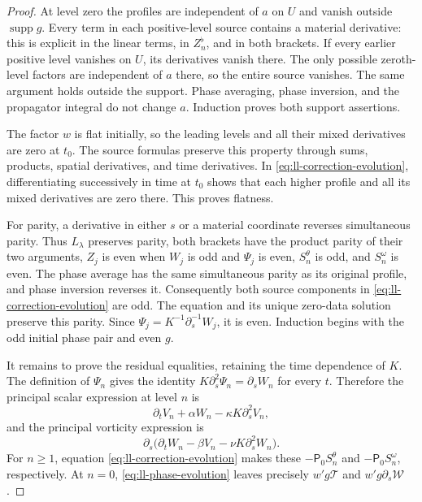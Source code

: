 \begin{proof}
At level zero the profiles are independent of $a$ on $U$ and vanish
outside $\operatorname{supp}g$. Every term in each positive-level
source contains a material derivative: this is explicit in the linear
terms, in $Z_n^\flat$, and in both brackets. If every earlier positive
level vanishes on $U$, its derivatives vanish there. The only possible
zeroth-level factors are independent of $a$ there, so the entire source
vanishes. The same argument holds outside the support. Phase averaging,
phase inversion, and the propagator integral do not change $a$.
Induction proves both support assertions.

The factor $w$ is flat initially, so the leading levels and all their
mixed derivatives are zero at $t_0$. The source formulas preserve this
property through sums, products, spatial derivatives, and time
derivatives. In \eqref{eq:ll-correction-evolution}, differentiating
successively in time at $t_0$ shows that each higher profile and all
its mixed derivatives are zero there. This proves flatness.

For parity, a derivative in either $s$ or a material coordinate
reverses simultaneous parity. Thus $L_\lambda$ preserves parity,
both brackets have the product parity of their two arguments,
$Z_j$ is even when $W_j$ is odd and $\Psi_j$ is even,
$S_n^\theta$ is odd, and $S_n^\omega$ is even.
The phase average has the same simultaneous parity as its original
profile, and phase inversion reverses it. Consequently both source
components in \eqref{eq:ll-correction-evolution} are odd. The
equation and its unique zero-data solution preserve this parity.
Since $\Psi_j=K^{-1}\partial_s^{-1}W_j$, it is even.
Induction begins with the odd initial phase pair and even $g$.

It remains to prove the residual equalities, retaining the time
dependence of $K$. The definition of $\Psi_n$ gives the identity
$K\partial_s^2\Psi_n=\partial_sW_n$ for every $t$. Therefore
the principal scalar expression at level $n$ is
\[
\partial_tV_n+\alpha W_n-\kappa K\partial_s^2V_n,
\]
and the principal vorticity expression is
\[
\partial_s\bigl(\partial_tW_n-\beta V_n
                         -\nu K\partial_s^2W_n\bigr).
\]
For $n\geq1$, equation \eqref{eq:ll-correction-evolution} makes
these $-\mathsf P_0S_n^\theta$ and
$-\mathsf P_0S_n^\omega$, respectively. At $n=0$,
\eqref{eq:ll-phase-evolution} leaves precisely $w'g\mathcal T$
and $w'g\partial_s\mathcal W$.


\end{proof}
